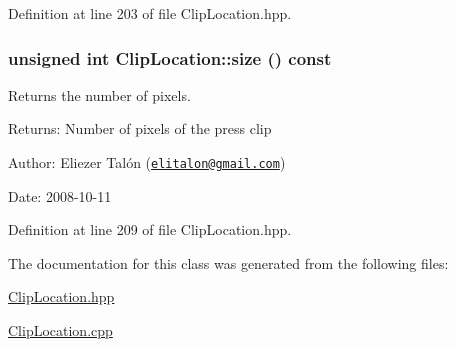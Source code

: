 Definition at line 203 of file ClipLocation.hpp.\hypertarget{class_clip_location_2d01b03e23d610b26bbb2e18278cf5a8}{
\subsubsection[size]{\setlength{\rightskip}{0pt plus 5cm}unsigned int ClipLocation::size () const}}
\label{class_clip_location_2d01b03e23d610b26bbb2e18278cf5a8}


Returns the number of pixels. 

\begin{Desc}
\item[Returns:]Number of pixels of the press clip\end{Desc}
\begin{Desc}
\item[Author:]Eliezer Talón (\href{mailto:elitalon@gmail.com}{\tt elitalon@gmail.com}) \end{Desc}
\begin{Desc}
\item[Date:]2008-10-11 \end{Desc}


Definition at line 209 of file ClipLocation.hpp.

The documentation for this class was generated from the following files:\begin{CompactItemize}
\item 
\hyperlink{_clip_location_8hpp}{ClipLocation.hpp}\item 
\hyperlink{_clip_location_8cpp}{ClipLocation.cpp}\end{CompactItemize}
